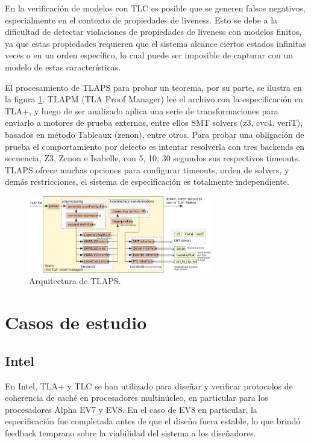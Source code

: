 \documentclass[runningheads]{llncs}
\begin{document}
En la verificación de modelos con TLC es posible que se generen falsos negativos, especialmente en el contexto de propiedades de liveness. Esto se debe a la dificultad de detectar violaciones de propiedades de liveness con modelos finitos, ya que estas propiedades requieren que el sistema alcance ciertos estados infinitas veces o en un orden específico, lo cual puede ser imposible de capturar con un modelo de estas características.

El procesamiento de TLAPS para probar un teorema, por su parte, se ilustra en la figura \ref{fig1}. TLAPM (TLA Proof Manager) lee el archivo con la especificación en TLA+, y luego de ser analizado aplica una serie de transformaciones para enviarlo a motores de prueba externos, entre ellos SMT solvers (z3, cvc4, veriT), basados en método Tableaux (zenon), entre otros. 
Para probar una obligación de prueba el comportamiento por defecto es intentar resolverla con tres backends en secuencia, Z3, Zenon e Isabelle, con 5, 10, 30 segundos sus respectivos timeouts.
TLAPS ofrece muchas opciones para configurar timeouts, orden de solvers, y demás restricciones, el sistema de especificación es totalmente independiente.

\begin{figure}
    \caption{Arquitectura de TLAPS.}\label{fig1}
    \includegraphics[width=8cm]{tlaps_arch.png}
    \centering
\end{figure}

\section{Casos de estudio}
\subsection{Intel}
En Intel, TLA+ y TLC se han utilizado para diseñar y verificar protocolos de coherencia de caché en procesadores multinúcleo, en particular para los procesadores Alpha EV7 y EV8. En el caso de EV8 en particular, la especificación fue completada antes de que el diseño fuera estable, lo que brindó feedback temprano sobre la viabilidad del sistema a los diseñadores.
\end{document}
